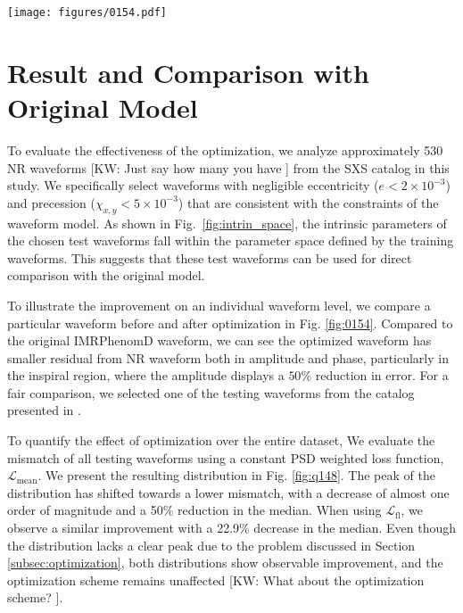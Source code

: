 \documentclass[twocolumn]{aastex631}
\newcommand{\kw}[1]{{\color{rb4}[KW: #1 ]}}
\begin{document}
\begin{figure*}[t]
	\centering
	\texttt{[image: figures/0154.pdf]}
	\caption{Comparison between original and optimized IMRPhenomD waveforms.
	Here shows the SXS:BBH:0154 NR waveform, which has mass ratio $q=1$ and
	$\chi_1=\chi_2=-0.8$. The original mismatch is around $2.8\times10^{-4}$ and
	the optimized mismatch is around $5.3\times10^{-5}$. Top: It shows the
	amplitude and phase of NR, original IMRPhenomD and optimized IMRPhenomD
	waveform. Bottom: It shows the relative error of amplitudes between NR and
	IMRPhenomD waveforms, and the absolute error of phases between NR and
	IMRPhenomD waveforms}
	\label{fig:0154}
\end{figure*}

\section{Result and Comparison with Original Model} \label{sec:result}

To evaluate the effectiveness of the optimization, we analyze approximately 530
NR waveforms \kw{Just say how many you have} from the SXS catalog in this study.
We specifically select waveforms with negligible eccentricity
(${e<2\times10^{-3}}$) and precession (${ \chi_{x,y}<5\times10^{-3}}$) that are
consistent with the constraints of the waveform model. As shown in
Fig.~\ref{fig:intrin_space}, the intrinsic parameters of the chosen test
waveforms fall within the parameter space defined by the training waveforms.
This suggests that these test waveforms can be used for direct comparison with
the original model.

To illustrate the improvement on an individual waveform level, we compare a
particular waveform before and after optimization in Fig. \ref{fig:0154}.
Compared to the original IMRPhenomD waveform, we can see the optimized waveform
has smaller residual from NR waveform both in amplitude and phase, particularly
in the inspiral region, where the amplitude displays a $50\%$ reduction in
error. For a fair comparison, we selected one of the testing waveforms from the
catalog presented in \citep{khan2016frequency}.

To quantify the effect of optimization over the entire dataset, We evaluate the
mismatch of all testing waveforms using a constant PSD weighted loss function,
$\mathcal{L}_{\mathrm{mean}}$. We present the resulting distribution in Fig.
\ref{fig:q148}. The peak of the distribution has shifted towards a lower
mismatch, with a decrease of almost one order of magnitude and a 50\% reduction
in the median. When using $\mathcal{L}_{\mathrm{fl}}$, we observe a similar
improvement with a 22.9\% decrease in the median. Even though the distribution
lacks a clear peak due to the problem discussed in Section
\ref{subsec:optimization}, both distributions show observable improvement, and
the optimization scheme remains unaffected \kw{What about the optimization scheme?}.
\end{document}
